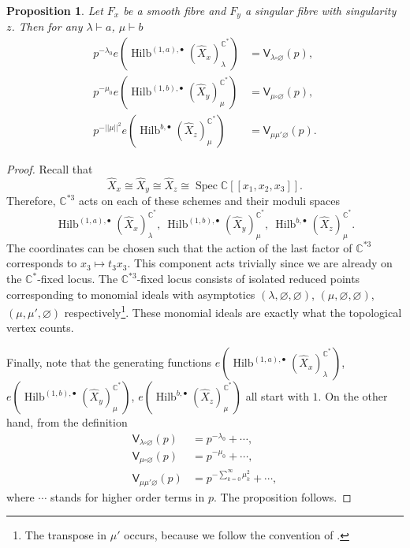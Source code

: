 \documentclass{amsart}
\newtheorem{proposition}[theorem]{Proposition}
\theoremstyle{definition}
\newcommand{\CC} {\mathbb{C}}          %
\newcommand{\sfV}{\mathsf{V}}
\newcommand{\Hilb}{\operatorname{Hilb}}
\newcommand{\Spec}{\operatorname{Spec}}
\begin{document}
\begin{proposition} \label{vertex1}
Let $F_x$ be a smooth fibre and $F_y$ a singular fibre with singularity $z$. Then for any $\lambda \vdash a$, $\mu \vdash b$
\begin{align*}
p^{-\lambda_0} e(\Hilb^{(1,a),\bullet}(\widehat{X}_x)_{\lambda}^{\CC^*}) &= \sfV_{\lambda\square\varnothing}(p), \\
p^{-\mu_0} e(\Hilb^{(1,b),\bullet}(\widehat{X}_y)_{\mu}^{\CC^*}) &= \sfV_{\mu\square\varnothing}(p), \\
p^{-|\!|\mu|\!|^2} e(\Hilb^{b,\bullet}(\widehat{X}_z)_{\mu}^{\CC^*}) &= \sfV_{\mu\mu'\varnothing}(p).
\end{align*}
\end{proposition}
\begin{proof}
Recall that $$\widehat{X}_x \cong \widehat{X}_y \cong \widehat{X}_z \cong \Spec \CC[\![x_1,x_2,x_3]\!].$$ Therefore, $\CC^{*3}$ acts on each of these schemes and their moduli spaces 
$$
\Hilb^{(1,a),\bullet}(\widehat{X}_x)_{\lambda}^{\CC^*}, \ \Hilb^{(1,b),\bullet}(\widehat{X}_y)_{\mu}^{\CC^*}, \ \Hilb^{b,\bullet}(\widehat{X}_z)_{\mu}^{\CC^*}.
$$
The coordinates can be chosen such that the action of the last factor of $\CC^{*3}$ corresponds to $x_3 \mapsto t_3 x_3$. This component acts trivially since we are already on the $\CC^*$-fixed locus. The $\CC^{*3}$-fixed locus consists of isolated reduced points corresponding to monomial ideals with asymptotics $(\lambda,\varnothing,\varnothing)$, $(\mu,\varnothing,\varnothing)$, $(\mu,\mu',\varnothing)$ respectively\footnote{The transpose in $\mu'$ occurs, because we follow the convention of \cite{ORV}.}. These monomial ideals are exactly what the topological vertex counts. 

Finally, note that the generating functions $e(\Hilb^{(1,a),\bullet}(\widehat{X}_x)_{\lambda}^{\CC^*})$, $e(\Hilb^{(1,b),\bullet}(\widehat{X}_y)_{\mu}^{\CC^*})$, $e(\Hilb^{b,\bullet}(\widehat{X}_z)_{\mu}^{\CC^*})$ all start with $1$. On the other hand, from the definition
\begin{align*}
\sfV_{\lambda\square\varnothing}(p) &= p^{-\lambda_0} + \cdots, \\
\sfV_{\mu\square\varnothing}(p) &= p^{-\mu_0} + \cdots, \\
\sfV_{\mu\mu'\varnothing}(p) &= p^{-\sum_{k=0}^{\infty} \mu_{k}^{2}} + \cdots,
\end{align*}
where $\cdots$ stands for higher order terms in $p$. The proposition follows.
\end{proof}
\end{document}
